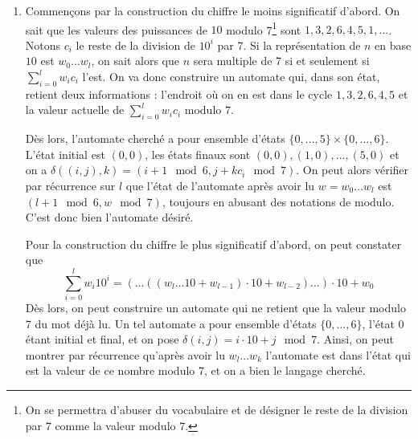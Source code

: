 \begin{sol}
\begin{enumerate}
\item Commençons par la construction du chiffre le moins significatif d'abord. On sait que les valeurs des puissances de $10$ modulo 7\footnote{On se permettra d'abuser du vocabulaire et de désigner le reste de la division par $7$ comme la valeur modulo $7$.} sont $1, 3, 2, 6, 4, 5, 1, \dots$. Notons $c_i$ le reste de la division de $10^i$ par 7. Si la représentation de $n$ en base $10$ est $w_0\dots w_l$, on sait alors que $n$ sera multiple de 7 si et seulement si $\sum_{i = 0}^l w_ic_i$ l'est. On va donc construire un automate qui, dans son état, retient deux informations : l'endroit où on en est dans le cycle $1, 3, 2, 6, 4, 5$ et la valeur actuelle de $\sum_{i = 0}^l w_ic_i$ modulo $7$.

Dès lors, l'automate cherché a pour ensemble d'états $\{0, \dots, 5\}\times\{0, \dots, 6\}$. L'état initial est $(0, 0)$, les états finaux sont $(0, 0),(1, 0), \dots, (5, 0)$ et on a $\delta((i, j),k) = (i + 1 \mod 6, j + kc_i \mod 7)$. On peut alors vérifier par récurrence sur $l$ que l'état de l'automate après avoir lu $w = w_0\dots w_l$ est $(l+1\mod 6, w\mod 7)$, toujours en abusant des notations de modulo. C'est donc bien l'automate désiré.

Pour la construction du chiffre le plus significatif d'abord, on peut constater que
$$\sum_{i = 0}^l w_i10^i = (\dots((w_l\dots 10 + w_{l-1})\cdot 10 + w_{l - 2})\dots)\cdot 10 + w_0$$
Dès lors, on peut construire un automate qui ne retient que la valeur modulo $7$ du mot déjà lu. Un tel automate a pour ensemble d'états $\{0, \dots, 6\}$, l'état $0$ étant initial et final, et on pose $\delta(i, j) = i \cdot 10 + j \mod 7$. Ainsi, on peut montrer par récurrence qu'après avoir lu $w_l\dots w_k$ l'automate est dans l'état qui est la valeur de ce nombre modulo $7$, et on a bien le langage cherché.
\end{enumerate}
\end{sol}

